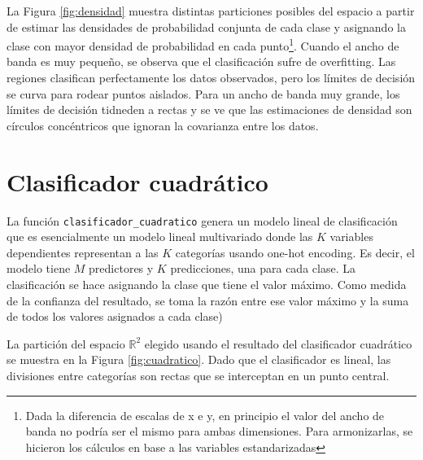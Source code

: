 \documentclass[]{tufte-handout}
\begin{document}
La Figura \ref{fig:densidad} muestra distintas particiones posibles del espacio a partir de estimar las densidades de probabilidad conjunta de cada clase y asignando la clase con mayor densidad de probabilidad en cada punto\footnote{Dada la diferencia de escalas de x e y, en principio el valor del ancho de banda no podría ser el mismo para ambas dimensiones. Para armonizarlas, se hicieron los cálculos en base a las variables estandarizadas}. Cuando el ancho de banda es muy pequeño, se observa que el clasificación sufre de overfitting. Las regiones clasifican perfectamente los datos observados, pero los límites de decisión se curva para rodear puntos aislados. Para un ancho de banda muy grande, los límites de decisión tidneden a rectas y se ve que las estimaciones de densidad son círculos concéntricos que ignoran la covarianza entre los datos.

\hypertarget{clasificador-cuadruxe1tico}{%
\section{Clasificador cuadrático}\label{clasificador-cuadruxe1tico}}

La función \texttt{clasificador\_cuadratico} genera un modelo lineal de clasificación que es esencialmente un modelo lineal multivariado donde las \(K\) variables dependientes representan a las \(K\) categorías usando one-hot encoding. Es decir, el modelo tiene \(M\) predictores y \(K\) predicciones, una para cada clase. La clasificación se hace asignando la clase que tiene el valor máximo. Como medida de la confianza del resultado, se toma la razón entre ese valor máximo y la suma de todos los valores asignados a cada clase)

La partición del espacio \(\mathbb{R}^2\) elegido usando el resultado del clasificador cuadrático se muestra en la Figura \ref{fig:cuadratico}. Dado que el clasificador es lineal, las divisiones entre categorías son rectas que se interceptan en un punto central.
\end{document}
